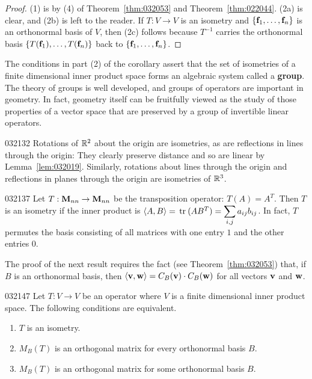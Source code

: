 \begin{proof}
(1) is by (4) of Theorem~\ref{thm:032053} and Theorem~\ref{thm:022044}. (2a) is clear, and (2b) is left to the reader. If $T : V \to V$ is an isometry and $\{\textbf{f}_{1}, \dots, \textbf{f}_{n}\}$ is an orthonormal basis of $V$, then (2c) follows because $T^{-1}$ carries the orthonormal basis $\{T(\textbf{f}_{1}), \dots, T(\textbf{f}_{n})\}$ back to $\{\textbf{f}_{1}, \dots, \textbf{f}_{n}\}$.
\end{proof}

The conditions in part (2) of the corollary assert that the set of isometries of a finite dimensional inner product space forms an algebraic system called a \textbf{group}. The theory of groups is well developed, and groups of operators are important in geometry. In fact, geometry itself can be fruitfully viewed as the study of those properties of a vector space that are preserved by a group of invertible linear operators.

\begin{example}{}{032132}
Rotations of $\mathbb{R}^2$ about the origin are isometries, as are reflections in lines through the origin: They clearly preserve distance and so are linear by Lemma~\ref{lem:032019}. Similarly, rotations about lines through the origin and reflections in planes through the origin are isometries of $\mathbb{R}^3$.
\end{example}

\begin{example}{}{032137}
Let $T : \textbf{M}_{nn} \to \textbf{M}_{nn}$ be the transposition operator: $T(A) = A^{T}$. Then $T$ is an isometry if the inner product is 
$ \langle A, B \rangle = \thinspace\operatorname{tr\medspace} (AB^T) = \displaystyle \sum_{i, j} a_{ij}b_{ij} $. In fact, $T$ permutes the basis consisting of all matrices with one entry $1$ and the other entries $0$.
\end{example}

The proof of the next result requires the fact (see Theorem~\ref{thm:032053}) that, if $B$ is an orthonormal basis, then $\langle\textbf{v}, \textbf{w} \rangle = C_{B}(\textbf{v}) \cdot C_{B}(\textbf{w})$ for all vectors $\textbf{v}$ and $\textbf{w}$.

\begin{theorem}{}{032147}
Let $T : V \to V$ be an operator where $V$ is a finite dimensional inner product space. The following conditions are equivalent.

\begin{enumerate}
\item $T$ is an isometry.

\item $M_{B}(T)$ is an orthogonal matrix for every orthonormal basis $B$.

\item $M_{B}(T)$ is an orthogonal matrix for some orthonormal basis $B$.

\end{enumerate}
\end{theorem}

